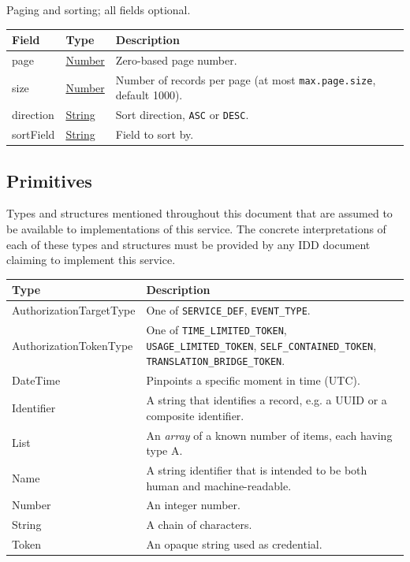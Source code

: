 \documentclass[a4paper]{arrowhead}
\newcommand{\pdef}[1]{{\textcolor{ArrowheadGrey}{#1\label{sec:model:primitives:#1}\label{sec:model:primitives:#1s}\label{sec:model:primitives:#1es}}}}
\newcommand{\pref}[1]{{\textcolor{ArrowheadGrey}{\hyperref[sec:model:primitives:#1]{#1}}}}
\begin{document}

Paging and sorting; all fields optional.


\noindent\begin{tabularx}{\textwidth}{| >{\raggedright\arraybackslash}p{3.9cm} | >{\raggedright\arraybackslash\small}p{5.3cm} | X |} \hline
\rowcolor{gray!33} Field & Type & Description \\ \hline
page & \pref{Number} & Zero-based page number. \\ \hline
size & \pref{Number} & Number of records per page (at most \texttt{max.\allowbreak{}page.\allowbreak{}size}, default 1000). \\ \hline
direction & \pref{String} & Sort direction, \texttt{ASC} or \texttt{DESC}. \\ \hline
sort\allowbreak{}Field & \pref{String} & Field to sort by. \\ \hline
\end{tabularx}



\subsection{Primitives}
\label{sec:model:primitives}

Types and structures mentioned throughout this document that are assumed to be available to implementations of this service.
The concrete interpretations of each of these types and structures must be provided by any IDD document claiming to implement this service.

\noindent\begin{tabularx}{\textwidth}{| p{4.6cm} | X |} \hline
\rowcolor{gray!33} Type & Description \\ \hline
\pdef{AuthorizationTargetType} & One of \texttt{SERVICE\_\allowbreak{}DEF}, \texttt{EVENT\_\allowbreak{}TYPE}. \\ \hline
\pdef{AuthorizationTokenType} & One of \texttt{TIME\_\allowbreak{}LIMITED\_\allowbreak{}TOKEN}, \texttt{USAGE\_\allowbreak{}LIMITED\_\allowbreak{}TOKEN}, \texttt{SELF\_\allowbreak{}CONTAINED\_\allowbreak{}TOKEN}, \texttt{TRANSLATION\_\allowbreak{}BRIDGE\_\allowbreak{}TOKEN}. \\ \hline
\pdef{DateTime} & Pinpoints a specific moment in time (UTC). \\ \hline
\pdef{Identifier} & A string that identifies a record, e.g. a UUID or a composite identifier. \\ \hline
\pdef{List} & An \textit{array} of a known number of items, each having type A. \\ \hline
\pdef{Name} & A string identifier that is intended to be both human and machine-readable. \\ \hline
\pdef{Number} & An integer number. \\ \hline
\pdef{String} & A chain of characters. \\ \hline
\pdef{Token} & An opaque string used as credential. \\ \hline
\end{tabularx}
\end{document}
